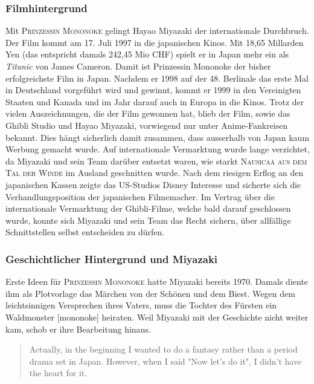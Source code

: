 \subsubsection{Filmhintergrund} 
Mit \textsc{Prinzessin Mononoke} gelingt Hayao Miyazaki der internationale Durchbruch. Der Film kommt am 17. Juli 1997 in die japanischen Kinos. Mit 18,65 Millarden Yen (das entspricht damals 242,45 Mio CHF) spielt er in Japan mehr ein als \emph{Titanic} von James Cameron. Damit ist Prinzessin Mononoke der bisher erfolgreichste Film in Japan. Nachdem er 1998 auf der 48. Berlinale das erste Mal in Deutschland vorgeführt wird und  gewinnt, kommt er 1999 in den Vereinigten Staaten und Kanada und im Jahr darauf auch in Europa in die Kinos. Trotz der vielen Auszeichnungen, die der Film gewonnen hat, blieb der Film, sowie das Ghibli Studio und Hayao Miyazaki, vorwiegend nur unter Anime-Fankreisen bekannt. Dies hängt sicherlich damit zusammen, dass ausserhalb von Japan kaum Werbung gemacht wurde. Auf internationale Vermarktung wurde lange verzichtet, da Miyazaki und sein Team darüber entsetzt waren, wie starkt \textsc{Nausicaä aus dem Tal der Winde} im Ausland geschnitten wurde. 
Nach dem riesigen Erflog an den japanischen Kassen zeigte das US-Studios Disney Interesse und sicherte sich die Verhandlungsposition der japanischen Filmemacher. Im Vertrag über die internationale Vermarktung der Ghibli-Filme, welche bald darauf geschlossen wurde, konnte sich Miyazaki und sein Team das Recht sichern, über allfällige Schnittstellen selbst entscheiden zu dürfen. 

\subsubsection*{Geschichtlicher Hintergrund und Miyazaki} 
Erste Ideen für \textsc{Prinzessin Mononoke} hatte Miyazaki bereits 1970. Damals diente ihm als Plotvorlage das Märchen von der Schönen und dem Biest. Wegen dem leichtsinnigen Versprechen ihres Vaters, muss die Tochter des Fürsten ein Waldmonster [mononoke] heiraten. Weil Miyazaki mit der Geschichte nicht weiter kam, schob er ihre Bearbeitung hinaus. 

\begin{quote} \glqq Actually, in the beginning I wanted to do a fantasy rather than a period drama set in Japan. However, when I said "Now let's do it", I didn't have the heart for it.\grqq {} 
\end{quote}


